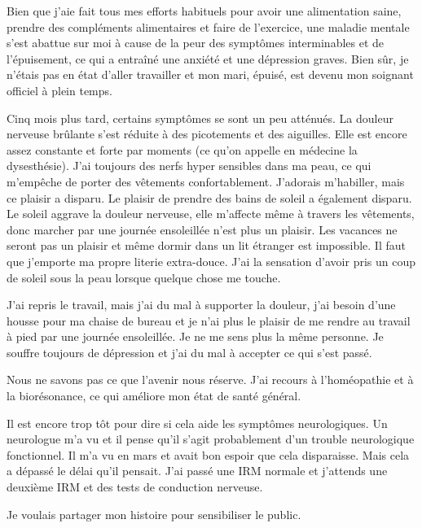 {Bien que j'aie fait tous mes efforts habituels pour avoir une alimentation
saine, prendre des compléments alimentaires et faire de l'exercice, une maladie
mentale s'est abattue sur moi à cause de la peur des symptômes interminables et
de l'épuisement, ce qui a entraîné une anxiété et une dépression graves. Bien
sûr, je n'étais pas en état d'aller travailler et mon mari, épuisé, est devenu
mon soignant officiel à plein temps.

Cinq mois plus tard, certains symptômes se sont un peu atténués. La douleur
nerveuse brûlante s'est réduite à des picotements et des aiguilles. Elle est
encore assez constante et forte par moments (ce qu'on appelle en médecine la
dysesthésie). J'ai toujours des nerfs hyper sensibles dans ma peau, ce qui
m'empêche de porter des vêtements confortablement. J'adorais m'habiller, mais ce
plaisir a disparu. Le plaisir de prendre des bains de soleil a également
disparu. Le soleil aggrave la douleur nerveuse, elle m'affecte même à travers
les vêtements, donc marcher par une journée ensoleillée n'est plus un
plaisir. Les vacances ne seront pas un plaisir et même dormir dans un lit
étranger est impossible. Il faut que j'emporte ma propre literie
extra-douce. J'ai la sensation d'avoir pris un coup de soleil sous la peau
lorsque quelque chose me touche.

J'ai repris le travail, mais j'ai du mal à supporter la douleur, j'ai besoin
d'une housse pour ma chaise de bureau et je n'ai plus le plaisir de me rendre au
travail à pied par une journée ensoleillée. Je ne me sens plus la même
personne. Je souffre toujours de dépression et j'ai du mal à accepter ce qui
s'est passé.

Nous ne savons pas ce que l'avenir nous réserve. J'ai recours à l'homéopathie et
à la biorésonance, ce qui améliore mon état de santé général.

Il est encore trop tôt pour dire si cela aide les symptômes neurologiques. Un
neurologue m'a vu et il pense qu'il s'agit probablement d'un trouble
neurologique fonctionnel. Il m'a vu en mars et avait bon espoir que cela
disparaisse. Mais cela a dépassé le délai qu'il pensait. J'ai passé une IRM
normale et j'attends une deuxième IRM et des tests de conduction nerveuse.

Je voulais partager mon histoire pour sensibiliser le public.

}

